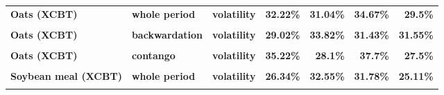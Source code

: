 \documentclass[
  authoryear,
  preprint,
  3p]{elsarticle}
\begin{document}
\begin{longtable}[t]{>{}l>{}l>{}l>{}r>{}r>{}r>{}r}
\textbf{Oats (XCBT)} & \textbf{whole period} & \textbf{volatility} & \textcolor[HTML]{4285f4}{\textbf{32.22\%}} & \textcolor[HTML]{4285f4}{\textbf{31.04\%}} & \textcolor[HTML]{4285f4}{\textbf{34.67\%}} & \textcolor[HTML]{4285f4}{\textbf{29.5\%}}\\
\textbf{\cellcolor{gray!10}{Oats (XCBT)}} & \textbf{\cellcolor{gray!10}{backwardation}} & \textbf{\cellcolor{gray!10}{mean}} & \textcolor[HTML]{4285f4}{\textbf{\cellcolor{gray!10}{-5.39\%}}} & \textcolor[HTML]{4285f4}{\textbf{\cellcolor{gray!10}{7.82\%}}} & \textcolor[HTML]{4285f4}{\textbf{\cellcolor{gray!10}{7.85\%}}} & \textcolor[HTML]{4285f4}{\textbf{\cellcolor{gray!10}{2.56\%}}}\\
\textbf{Oats (XCBT)} & \textbf{backwardation} & \textbf{volatility} & \textcolor[HTML]{4285f4}{\textbf{29.02\%}} & \textcolor[HTML]{4285f4}{\textbf{33.82\%}} & \textcolor[HTML]{4285f4}{\textbf{31.43\%}} & \textcolor[HTML]{4285f4}{\textbf{31.55\%}}\\
\addlinespace
\textbf{\cellcolor{gray!10}{Oats (XCBT)}} & \textbf{\cellcolor{gray!10}{contango}} & \textbf{\cellcolor{gray!10}{mean}} & \textcolor[HTML]{4285f4}{\textbf{\cellcolor{gray!10}{16.95\%}}} & \textcolor[HTML]{4285f4}{\textbf{\cellcolor{gray!10}{*35.38\%}}} & \textcolor[HTML]{4285f4}{\textbf{\cellcolor{gray!10}{11.68\%}}} & \textcolor[HTML]{4285f4}{\textbf{\cellcolor{gray!10}{-3.17\%}}}\\
\textbf{Oats (XCBT)} & \textbf{contango} & \textbf{volatility} & \textcolor[HTML]{4285f4}{\textbf{35.22\%}} & \textcolor[HTML]{4285f4}{\textbf{28.1\%}} & \textcolor[HTML]{4285f4}{\textbf{37.7\%}} & \textcolor[HTML]{4285f4}{\textbf{27.5\%}}\\
\textbf{\cellcolor{gray!10}{Soybean meal (XCBT)}} & \textbf{\cellcolor{gray!10}{whole period}} & \textbf{\cellcolor{gray!10}{mean}} & \textcolor[HTML]{4285f4}{\textbf{\cellcolor{gray!10}{7.29\%}}} & \textcolor[HTML]{4285f4}{\textbf{\cellcolor{gray!10}{12.06\%}}} & \textcolor[HTML]{4285f4}{\textbf{\cellcolor{gray!10}{8.12\%}}} & \textcolor[HTML]{4285f4}{\textbf{\cellcolor{gray!10}{-0.33\%}}}\\
\textbf{Soybean meal (XCBT)} & \textbf{whole period} & \textbf{volatility} & \textcolor[HTML]{4285f4}{\textbf{26.34\%}} & \textcolor[HTML]{4285f4}{\textbf{32.55\%}} & \textcolor[HTML]{4285f4}{\textbf{31.78\%}} & \textcolor[HTML]{4285f4}{\textbf{25.11\%}}\\
\textbf{\cellcolor{gray!10}{Soybean meal (XCBT)}} & \textbf{\cellcolor{gray!10}{backwardation}} & \textbf{\cellcolor{gray!10}{mean}} & \textcolor[HTML]{4285f4}{\textbf{\cellcolor{gray!10}{13.15\%}}} & \textcolor[HTML]{4285f4}{\textbf{\cellcolor{gray!10}{8.22\%}}} & \textcolor[HTML]{4285f4}{\textbf{\cellcolor{gray!10}{16.04\%}}} & \textcolor[HTML]{4285f4}{\textbf{\cellcolor{gray!10}{-3.52\%}}}\\

\end{longtable}
\end{document}
